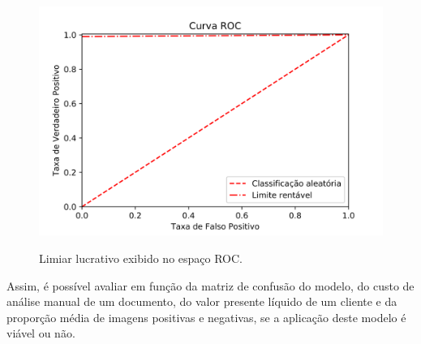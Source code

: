 \begin{figure}[htbp]
    \centering
    \caption{Limiar lucrativo exibido no espaço ROC.}
    \includegraphics[scale=1]{figs/curva_roc_lucro.png}
    \label{fig:profit_roc}
\end{figure}

Assim, é possível avaliar em função da matriz de confusão do modelo, do custo de análise manual de um documento, do valor presente líquido de um cliente e da proporção média de imagens positivas e negativas, se a aplicação deste modelo é viável ou não.
